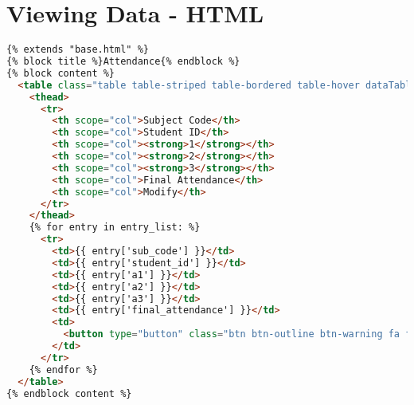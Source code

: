 \section{Viewing Data - HTML}
\begin{lstlisting}[language=HTML]
{% extends "base.html" %}
{% block title %}Attendance{% endblock %}
{% block content %}
  <table class="table table-striped table-bordered table-hover dataTables no-footer dtr-inline collapsed" style="width: 100%;" id="dataTables">
    <thead>
      <tr>
        <th scope="col">Subject Code</th>
        <th scope="col">Student ID</th>
        <th scope="col"><strong>1</strong></th>
        <th scope="col"><strong>2</strong></th>
        <th scope="col"><strong>3</strong></th>
        <th scope="col">Final Attendance</th>
        <th scope="col">Modify</th>
      </tr>
    </thead>
    {% for entry in entry_list: %}
      <tr>
        <td>{{ entry['sub_code'] }}</td>
        <td>{{ entry['student_id'] }}</td>
        <td>{{ entry['a1'] }}</td>
        <td>{{ entry['a2'] }}</td>
        <td>{{ entry['a3'] }}</td>
        <td>{{ entry['final_attendance'] }}</td>
        <td>
          <button type="button" class="btn btn-outline btn-warning fa fa-pencil" onclick="window.location.href='/modify/attendance/{{ entry['student_id'] }}/{{ entry['sub_code'] }}'"></button>
        </td>
      </tr>
    {% endfor %}
  </table>
{% endblock content %}
\end{lstlisting}
\pagebreak

